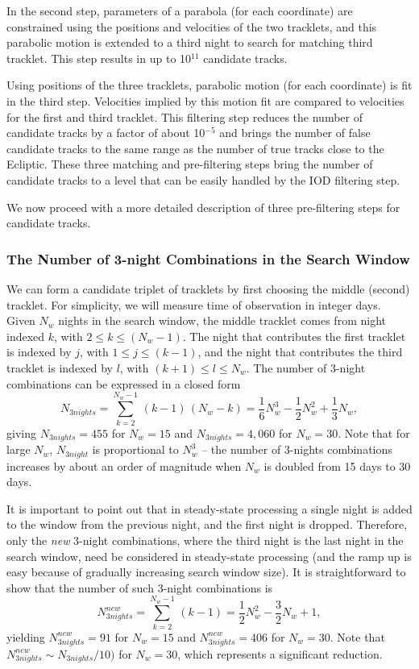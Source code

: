 In the second step, parameters of a parabola (for each coordinate) are constrained using the
positions and velocities of the two tracklets, and this parabolic motion is extended to a third
night to search for matching third tracklet. This step results in up to 10$^{11}$ candidate
tracks.

Using positions of the three tracklets, parabolic motion (for each coordinate) is fit
in the third step. Velocities implied by this motion fit are compared to velocities for
the first and third tracklet. This filtering step reduces the number of candidate tracks
by a factor of about 10$^{-5}$ and brings the number of false candidate tracks to
the same range as the number of true tracks close to the Ecliptic. These three matching
and pre-filtering steps bring the number of candidate tracks to a level that
can be easily handled by the IOD filtering step.

We now proceed with a more detailed description of  three pre-filtering steps
for candidate tracks.

\subsubsection{The Number of 3-night Combinations in the Search Window}

We can form a candidate triplet of tracklets by first choosing the middle (second) tracklet.
For simplicity, we will measure time of observation in integer days. Given $N_w$ nights
in the search window, the middle tracklet comes from night indexed $k$, with
$2 \le k \le (N_w-1)$. The night that contributes the first tracklet is indexed by $j$,
with $1 \le j \le (k-1)$, and the night that contributes the third tracklet is indexed by $l$,
with $(k+1) \le l \le N_w$. The number of 3-night combinations can be expressed in a closed
form
\begin{equation}
\label{eq:N3}
  N_{3nights} = \sum_{k=2}^{N_w-1} \, (k-1)\, (N_w-k) =\frac{1}{6}N_w^3 - \frac{1}{2}N_w^2 + \frac{1}{3}N_w,
\end{equation}
giving $N_{3nights} = 455$ for $N_w=15$ and $N_{3nights} = 4,060$ for $N_w=30$.  Note
that for large $N_w$, $N_{3night}$ is proportional to $N_w^3$ -- the number of 3-nights
combinations increases by about an order of magnitude when $N_w$ is doubled from
15 days to 30 days.

It is important to point out that in steady-state processing a single night is added to the
window from the previous night, and the first night is dropped. Therefore, only the {\it new}
3-night combinations, where the third night is the last night in the search window, need
be considered in steady-state processing (and the ramp up is easy because of gradually
increasing search window size). It is straightforward to show that the number of such
3-night combinations is
\begin{equation}
\label{eq:N3n}
  N_{3nights}^{new} = \sum_{k=2}^{N_w-1} \, (k-1) =\frac{1}{2}N_w^2 - \frac{3}{2}N_w + 1,
\end{equation}
yielding $N_{3nights}^{new} = 91$ for $N_w=15$ and $N_{3nights}^{new} = 406$ for $N_w=30$.
Note that $N_{3nights}^{new} \sim N_{3nights} / 10)$ for $N_w=30$, which represents
a significant reduction.


